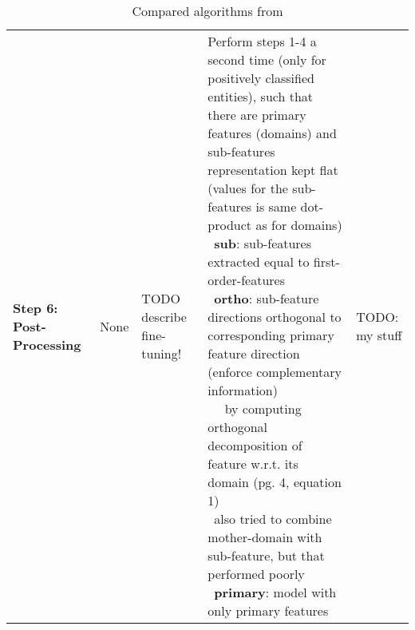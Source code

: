 {\begin{landscape}
\begin{table}[]
{\begin{tabular}{lllll}
			\textbf{Step 6: Post-Processing} 
			&                   
			None 
			&                 
			TODO describe fine-tuning! 
			& 
			\specialcell[l]{
				Perform steps 1-4 a second time (only for positively classified entities), such that there are primary features (domains) and sub-features \\ representation kept flat (values for the sub-features is same dot-product as for domains) \\ \textbullet\, \textbf{sub}: sub-features extracted equal to first-order-features \\ \textbullet\, \textbf{ortho}: sub-feature directions orthogonal to corresponding primary feature direction (enforce complementary information) \\ ~~ by computing orthogonal decomposition of feature w.r.t. its domain (pg. 4, equation 1) \\ \textbullet\, also tried to combine mother-domain with sub-feature, but that performed poorly \\ \textbullet\, \textbf{primary}: model with only primary features}
			&
			TODO: my stuff
			\end{tabular}
		}
		\caption{Compared algorithms from \mainalgos}
		\label{tab:compared_algos}
	\end{table}
\end{landscape}


\restoregeometry\clearpage
\aftergroup\restoregeometry  %
} %

